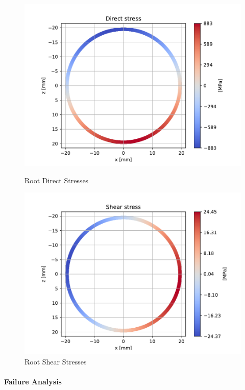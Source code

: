 \begin{figure}[H]
\centering
\begin{minipage}{.5\textwidth}
    \centering
    \includegraphics[scale=0.5]{Structures/Figures/root_sig}
    \caption{Root Direct Stresses}
    \label{fig:root_sig}
\end{minipage}%
\begin{minipage}{.5\textwidth}
    \centering
    \includegraphics[scale=0.5]{Structures/Figures/root_tau}
    \caption{Root Shear Stresses}
    \label{fig:root_tau}
\end{minipage}
\end{figure}

\paragraph{Failure Analysis}

